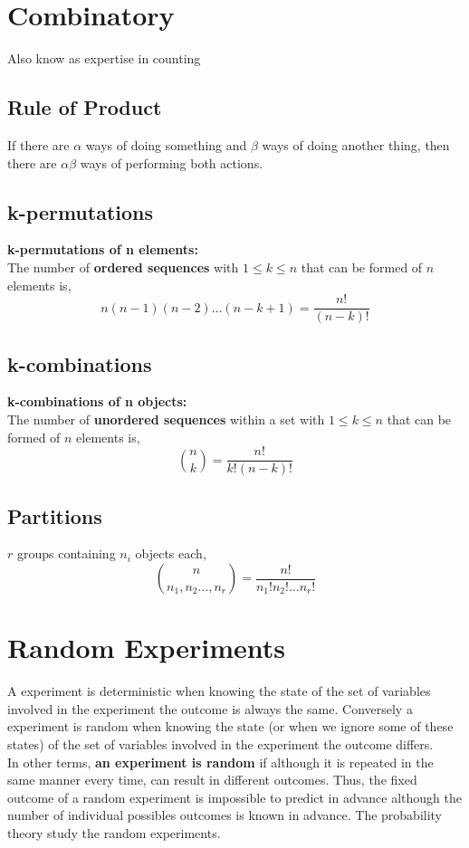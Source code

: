 \section{Combinatory}
Also know as expertise in counting

\subsection{Rule of Product}
If there are $\alpha$ ways of doing something and $\beta$ ways of doing another thing, then there are $\alpha\beta$ ways of performing both actions.

\subsection{k-permutations}
\textbf{k-permutations of n elements:}\\
The number of \textbf{ordered sequences} with $1\leq k \leq n$ that can be formed of $n$ elements is,
\[ n(n-1)(n-2)\dots(n-k+1) = \frac{n!}{(n-k)!} \]

\subsection{k-combinations}
\textbf{k-combinations of n objects:}\\
The number of \textbf{unordered sequences} within a set with $1\leq k \leq n$ that can be formed of $n$ elements is,
\[ \binom{n}{k} = \frac{n!}{k!(n-k)!} \]

\subsection{Partitions}
$r$ groups containing $n_i$ objects each,
\[ \binom{n}{n_1,n_2\dots,n_r} = \frac{n!}{n_1!n_2!\dots n_r!} \]

\section{Random Experiments}
 A experiment is deterministic when knowing the state of the set of variables involved in the experiment the outcome is always the same.
 Conversely a experiment is random when knowing the state (or when we ignore some of these states) of the set of variables involved in
 the experiment the outcome differs. \\
 
 In other terms, \textbf{an experiment is random} if although it is repeated in the same manner every time, can result in different outcomes. 
 Thus, the fixed outcome of a random experiment is impossible to predict in advance although the number of individual possibles outcomes is known in 
 advance.
 The probability theory study the random experiments.\\

